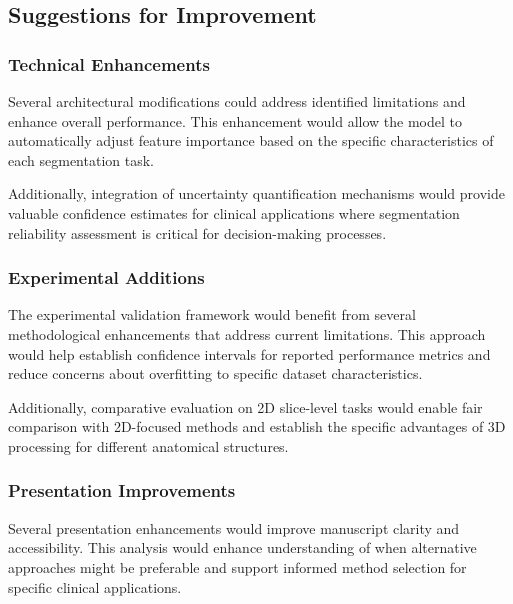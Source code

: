 \subsection{Suggestions for Improvement}
\subsubsection{Technical Enhancements}
Several architectural modifications could address identified limitations and enhance overall performance.  This enhancement would allow the model to automatically adjust feature importance based on the specific characteristics of each segmentation task.

 Additionally, integration of uncertainty quantification mechanisms would provide valuable confidence estimates for clinical applications where segmentation reliability assessment is critical for decision-making processes.

\subsubsection{Experimental Additions}
The experimental validation framework would benefit from several methodological enhancements that address current limitations.  This approach would help establish confidence intervals for reported performance metrics and reduce concerns about overfitting to specific dataset characteristics.

 Additionally, comparative evaluation on 2D slice-level tasks would enable fair comparison with 2D-focused methods and establish the specific advantages of 3D processing for different anatomical structures.

\subsubsection{Presentation Improvements}
Several presentation enhancements would improve manuscript clarity and accessibility.  This analysis would enhance understanding of when alternative approaches might be preferable and support informed method selection for specific clinical applications.

